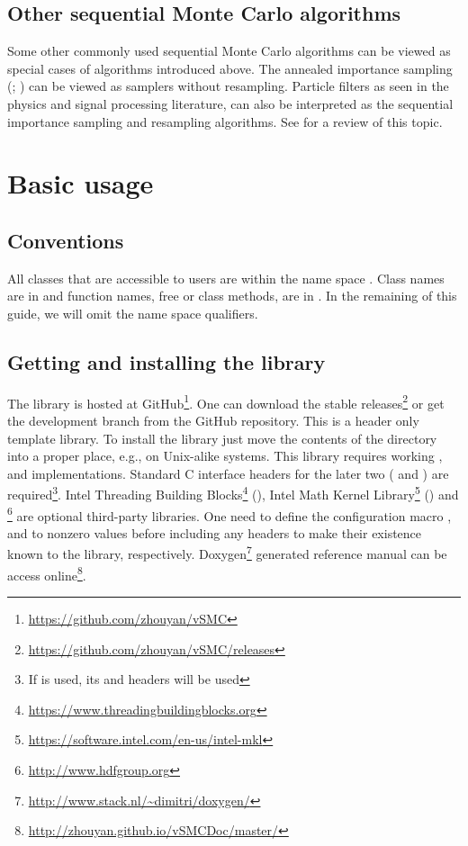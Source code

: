 \documentclass[11pt,bib,mint,hyper,altcolor]{marticle}
\begin{document}
\subsection{Other sequential Monte Carlo algorithms}
\label{sub:Other sequential Monte Carlo algorithms}

Some other commonly used sequential Monte Carlo algorithms can be viewed as
special cases of algorithms introduced above. The annealed importance sampling
(\ais; \textcite{Neal:2001we}) can be viewed as \smc samplers without
resampling. Particle filters as seen in the physics and signal processing
literature, can also be interpreted as the sequential importance sampling and
resampling algorithms. See \textcite{Doucet:2011us} for a review of this topic.

\section{Basic usage}
\label{sec:Basic usage}

\subsection{Conventions}
\label{sub:Conventions}

All classes that are accessible to users are within the name space
. Class names are in  and function names,
free or class methods, are in . In the remaining of this
guide, we will omit the  name space qualifiers.

\subsection{Getting and installing the library}
\label{sub:Getting and installing the library}

The library is hosted at
GitHub\footnote{\url{https://github.com/zhouyan/vSMC}}. One can download the
stable releases\footnote{\url{https://github.com/zhouyan/vSMC/releases}} or get
the development branch from the GitHub repository. This is a header only \cpp
template library. To install the library just move the contents of the
 directory into a proper place, e.g.,
 on Unix-alike systems. This library requires
working \cppoo, \blas and \lapack implementations. Standard C interface headers
for the later two ( and ) are
required\footnote{If \mkl is used, its  and
   headers will be used}. Intel Threading Building
Blocks\footnote{\url{https://www.threadingbuildingblocks.org}} (\tbb), Intel
Math Kernel Library\footnote{\url{https://software.intel.com/en-us/intel-mkl}}
(\mkl) and \hdf\footnote{\url{http://www.hdfgroup.org}} are optional
third-party libraries. One need to define the configuration macro
,  and
 to nonzero values before including any \vsmc headers
to make their existence known to the library, respectively.
Doxygen\footnote{\url{http://www.stack.nl/~dimitri/doxygen/}} generated
reference manual can be access
online\footnote{\url{http://zhouyan.github.io/vSMCDoc/master/}}.
\end{document}
